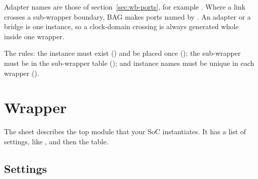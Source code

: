 Adapter names are those of section~\ref{sec:wb-ports}, for example
. Where a link crosses a sub-wrapper boundary, BAG makes
ports named by . An adapter or a bridge is one
instance, so a clock-domain crossing is always generated whole inside one wrapper.

The rules: the instance must exist () and be placed once
(); the sub-wrapper must be in the sub-wrapper table
(); and instance names must be unique in each wrapper
().

\section{Wrapper}

The  sheet describes the top module that your SoC instantiates. It has a
list of settings, like , and then the  table.

\subsection{Settings}

